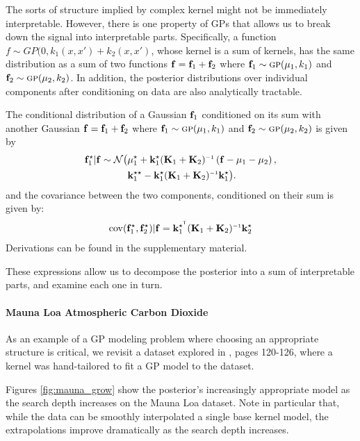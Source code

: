 \documentclass[twoside]{article}
\begin{document}
The sorts of structure implied by complex kernel might not be immediately interpretable.
However, there is one property of GPs that allows us to break down the signal into interpretable parts.
Specifically, a function $f \sim GP(0, k_1(x, x') + k_2(x,x')$, whose kernel is a sum of kernels, has the same distribution as a sum of two functions ${\bf{f}} = {\bf{f}}_1 + {\bf{f}}_2$ where ${\bf{f}}_1 \sim {\textsc{gp}}( {\bf{\mu}}_1, k_1)$ and ${\bf{f}}_2 \sim {\textsc{gp}}( {\bf{\mu}}_2, k_2)$.
In addition, the posterior distributions over individual components after conditioning on data are also analytically tractable.

The conditional distribution of a Gaussian ${\bf{f}}_1$ conditioned on its sum with another Gaussian ${\bf{f}} = {\bf{f}}_1 + {\bf{f}}_2$ where ${\bf{f}}_1 \sim {\textsc{gp}}( {\bf{\mu}}_1, k_1)$ and ${\bf{f}}_2 \sim {\textsc{gp}}( {\bf{\mu}}_2, k_2)$ is given by
\begin{align}
\vf_1^\star | \vf \sim \mathcal{N} \big( & \vmu_1^\star + \vk_1^\star (\vK_1 + \vK_2)\inv \left( \vf - \vmu_1 - \vmu_2 \right), \nonumber \\
& \vk_1^{\star\star} - \vk_1^\star (\vK_1 + \vK_2)\inv \vk_1^\star \big).
\end{align}
and the covariance between the two components, conditioned on their sum is given by:
\begin{align}
\cov(\vf_1^\star, \vf_2^\star) | \vf = \vk_1^{\star\tra} (\vK_1 + \vK_2)\inv \vk_2^\star
\end{align}
Derivations can be found in the supplementary material.

These expressions allow us to decompose the posterior into a sum of interpretable parts, and examine each one in turn.

\paragraph{Mauna Loa Atmospheric Carbon Dioxide}

As an example of a GP modeling problem where choosing an appropriate structure is critical, we revisit a dataset explored in \cite{rasmussen38gaussian}, pages 120-126, where a kernel was hand-tailored to fit a GP model to the dataset.

Figures \ref{fig:mauna_grow} show the posterior's increasingly appropriate model as the search depth increases on the Mauna Loa dataset.
Note in particular that, while the data can be smoothly interpolated a single base kernel model, the extrapolations improve dramatically as the search depth increases.
\end{document}
